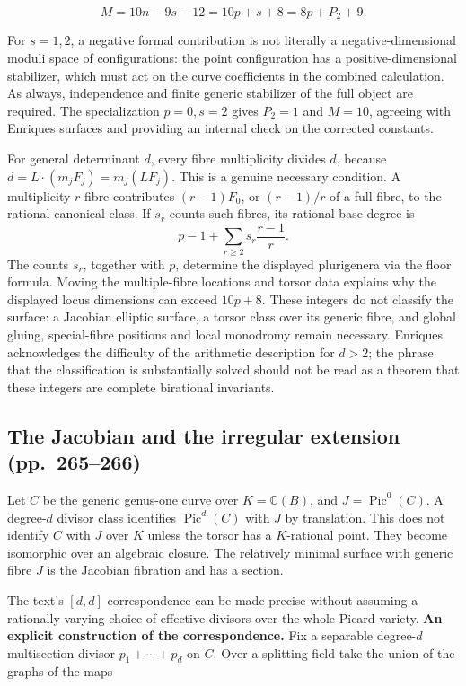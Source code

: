 \[
M=10n-9s-12=10p+s+8=8p+P_2+9.
\]

For \(s=1,2\), a negative formal contribution is not literally a negative-dimensional moduli space of configurations: the point configuration has a positive-dimensional stabilizer, which must act on the curve coefficients in the combined calculation. As always, independence and finite generic stabilizer of the full object are required. The specialization \(p=0,s=2\) gives \(P_2=1\) and \(M=10\), agreeing with Enriques surfaces and providing an internal check on the corrected constants.

For general determinant \(d\), every fibre multiplicity divides \(d\), because \(d=L\cdot(m_jF_j)=m_j(LF_j)\). This is a genuine necessary condition. A multiplicity-\(r\) fibre contributes \((r-1)F_0\), or \((r-1)/r\) of a full fibre, to the rational canonical class. If \(s_r\) counts such fibres, its rational base degree is
\[
p-1+\sum_{r\ge2}s_r\frac{r-1}{r}.
\]
The counts \(s_r\), together with \(p\), determine the displayed plurigenera via the floor formula. Moving the multiple-fibre locations and torsor data explains why the displayed locus dimensions can exceed \(10p+8\). These integers do not classify the surface: a Jacobian elliptic surface, a torsor class over its generic fibre, and global gluing, special-fibre positions and local monodromy remain necessary. Enriques acknowledges the difficulty of the arithmetic description for \(d>2\); the phrase that the classification is substantially solved should not be read as a theorem that these integers are complete birational invariants.

\subsection{The Jacobian and the irregular extension (pp.~265--266)}\label{cp2-vii-4-4}

Let \(C\) be the generic genus-one curve over \(K=\mathbb C(B)\), and \(J=\operatorname{Pic}^0(C)\). A degree-\(d\) divisor class identifies \(\operatorname{Pic}^d(C)\) with \(J\) by translation. This does not identify \(C\) with \(J\) over \(K\) unless the torsor has a \(K\)-rational point. They become isomorphic over an algebraic closure. The relatively minimal surface with generic fibre \(J\) is the Jacobian fibration and has a section.

The text's \([d,d]\) correspondence can be made precise without assuming a rationally varying choice of effective divisors over the whole Picard variety. \textbf{An explicit construction of the correspondence.} Fix a separable degree-\(d\) multisection divisor \(p_1+\cdots+p_d\) on \(C\). Over a splitting field take the union of the graphs of the maps

